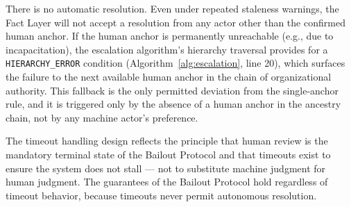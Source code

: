 There is no automatic resolution. Even under repeated staleness warnings, the Fact Layer will not accept a resolution from any actor other than the confirmed human anchor. If the human anchor is permanently unreachable (e.g., due to incapacitation), the escalation algorithm's hierarchy traversal provides for a \texttt{HIERARCHY\_ERROR} condition (Algorithm~\ref{alg:escalation}, line 20), which surfaces the failure to the next available human anchor in the chain of organizational authority. This fallback is the only permitted deviation from the single-anchor rule, and it is triggered only by the absence of a human anchor in the ancestry chain, not by any machine actor's preference.

The timeout handling design reflects the principle that human review is the mandatory terminal state of the Bailout Protocol and that timeouts exist to ensure the system does not stall --- not to substitute machine judgment for human judgment. The guarantees of the Bailout Protocol hold regardless of timeout behavior, because timeouts never permit autonomous resolution.

